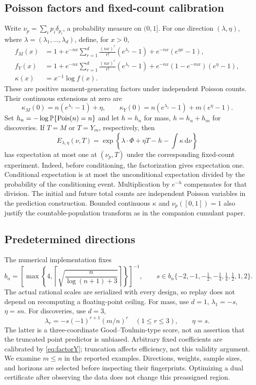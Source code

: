 \documentclass[11pt]{article}
\theoremstyle{remark}\newtheorem{remark}[theorem]{Remark}
\newcommand{\dd}{\,\mathrm d}\newcommand{\ind}{\mathbf1}
\begin{document}
\subsection{Poisson factors and fixed-count calibration}
Write $\nu_p=\sum_i p_i\delta_{p_i}$, a probability measure on $(0,1]$.
For one direction $(\lambda,\eta)$, where $\lambda=(\lambda_1,\ldots,\lambda_d)$,
define, for $x>0$,
\begin{align}
 f_M(x)&=1+e^{-nx}\sum_{r=1}^d\frac{(nx)^r}{r!}(e^{\lambda_r}-1)
                  +e^{-nx}(e^{\eta x}-1),\label{eq:factorM}\\
 f_Y(x)&=1+e^{-nx}\sum_{r=1}^d\frac{(nx)^r}{r!}(e^{\lambda_r}-1)
                  +e^{-nx}(1-e^{-mx})(e^\eta-1),\label{eq:factorY}\\
 \kappa(x)&=x^{-1}\log f(x).
\end{align}
These are positive moment-generating factors under independent Poisson
counts. Their continuous extensions at zero are
\[
 \kappa_M(0)=n(e^{\lambda_1}-1)+\eta,\qquad
 \kappa_Y(0)=n(e^{\lambda_1}-1)+m(e^\eta-1).
\]
Set $h_n=-\log\mathbb P\{\operatorname{Pois}(n)=n\}$ and let $h=h_n$ for mass,
$h=h_n+h_m$ for discoveries. If $T=M$ or $T=Y_m$, respectively, then
\begin{equation}\label{eq:evalue}
 E_{\lambda,\eta}(\nu,T)
 =\exp\left\{\lambda\cdot\Phi+\eta T-h-\int\kappa\dd\nu\right\}
\end{equation}
has expectation at most one at $(\nu_p,T)$ under the corresponding fixed-count
experiment. Indeed, before conditioning, the factorization gives expectation
one. Conditional expectation is at most the unconditional expectation divided
by the probability of the conditioning event. Multiplication by $e^{-h}$
compensates for that division. The initial and future total counts are
independent Poisson variables in the prediction construction. Bounded continuous
$\kappa$ and $\nu_p([0,1])=1$ also justify the countable-population transform
as in the companion cumulant paper.

\subsection{Predetermined directions}
The numerical implementation fixes
\[
 b_n=\left[\max\left\{4,\left\lceil\sqrt{\frac{n}{\log(n+1)+3}}\right\rceil\right\}\right]^{-1},
 \qquad s\in b_n\{-2,-1,-\tfrac12,-\tfrac14,\tfrac14,\tfrac12,1,2\}.
\]
The actual rational scales are serialized with every design, so replay does
not depend on recomputing a floating-point ceiling. For mass, use
$d=1$, $\lambda_1=-s$, $\eta=sn$. For discoveries, use $d=3$,
\[
 \lambda_r=-s(-1)^{r+1}(m/n)^r\quad(1\le r\le3),\qquad \eta=s.
\]
The latter is a three-coordinate Good--Toulmin-type score, not an assertion
that the truncated point predictor is unbiased. Arbitrary fixed coefficients
are calibrated by \eqref{eq:factorY}; truncation affects efficiency, not this
validity argument. We examine $m\le n$ in the reported examples. Directions,
weights, sample sizes, and horizons are selected before inspecting their
fingerprints. Optimizing a dual certificate after observing the data does
not change this preassigned region.
\end{document}
